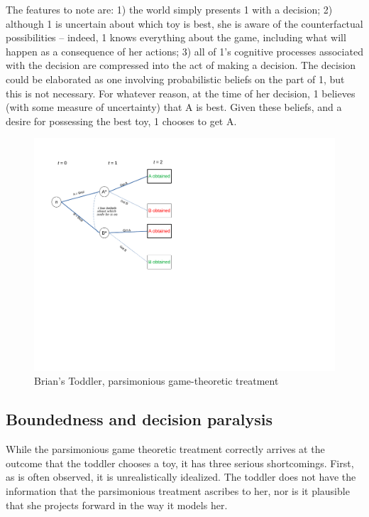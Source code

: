 \documentclass[
11pt,
titlepage,
reqno,
]{article}%
\theoremstyle{definition}
\begin{document}
The features to note are: 1) the world simply presents 1 with a decision; 2) although 1 is uncertain about which toy is best, she is aware of the counterfactual possibilities -- indeed, 1 knows everything about the game, including what will happen as a consequence of her actions; 3) all of 1's cognitive processes associated with the decision are compressed into the act of making a decision. The decision could be elaborated as one involving probabilistic beliefs on the part of 1, but this is not necessary. For whatever reason, at the time of her decision, 1 believes (with some measure of uncertainty) that A is best. Given these beliefs, and a desire for possessing the best toy, 1 chooses to get A.

\begin{figure}[h!]
	\centering
	\includegraphics*[page=1,trim = 0 3.5in 5in 0in,scale = .8]{Awareness_Diagrams_All}
	\caption{Brian's Toddler, parsimonious game-theoretic treatment\label{Diag: p-01}}%
\end{figure}

\subsection{Boundedness and decision paralysis}
While the parsimonious game theoretic treatment correctly arrives at the outcome that the toddler chooses a toy, it has three serious shortcomings. First, as is often observed, it is unrealistically idealized. The toddler does not have the information that the parsimonious treatment ascribes to her, nor is it plausible that she projects forward in the way it models her.
\end{document}

